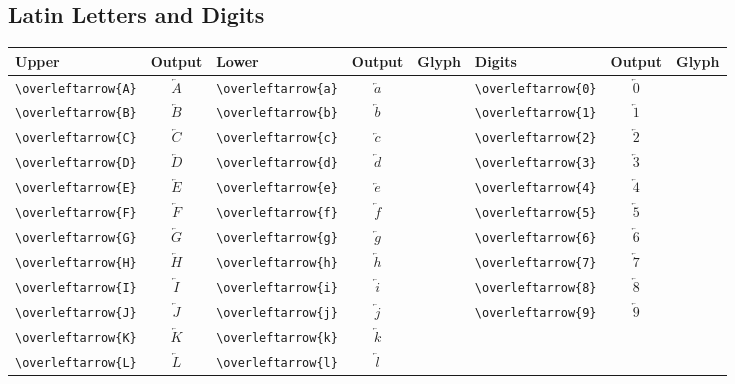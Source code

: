 \documentclass[12pt,a4paper]{article}
\begin{document}
\subsection*{Latin Letters and Digits}
\begin{longtable}{|l|c|l|c|c|l|c|c|}
\hline
\textbf{Upper} & \textbf{Output} & \textbf{Lower} & \textbf{Output} & \textbf{Glyph} & \textbf{Digits} & \textbf{Output} & \textbf{Glyph} \\
\hline
\verb|\overleftarrow{A}| & $\overleftarrow{A}$ & \verb|\overleftarrow{a}| & $\overleftarrow{a}$ & & \verb|\overleftarrow{0}| & $\overleftarrow{0}$ & \\
\verb|\overleftarrow{B}| & $\overleftarrow{B}$ & \verb|\overleftarrow{b}| & $\overleftarrow{b}$ & & \verb|\overleftarrow{1}| & $\overleftarrow{1}$ & \\
\verb|\overleftarrow{C}| & $\overleftarrow{C}$ & \verb|\overleftarrow{c}| & $\overleftarrow{c}$ & & \verb|\overleftarrow{2}| & $\overleftarrow{2}$ & \\
\verb|\overleftarrow{D}| & $\overleftarrow{D}$ & \verb|\overleftarrow{d}| & $\overleftarrow{d}$ & & \verb|\overleftarrow{3}| & $\overleftarrow{3}$ & \\
\verb|\overleftarrow{E}| & $\overleftarrow{E}$ & \verb|\overleftarrow{e}| & $\overleftarrow{e}$ & & \verb|\overleftarrow{4}| & $\overleftarrow{4}$ & \\
\verb|\overleftarrow{F}| & $\overleftarrow{F}$ & \verb|\overleftarrow{f}| & $\overleftarrow{f}$ & & \verb|\overleftarrow{5}| & $\overleftarrow{5}$ & \\
\verb|\overleftarrow{G}| & $\overleftarrow{G}$ & \verb|\overleftarrow{g}| & $\overleftarrow{g}$ & & \verb|\overleftarrow{6}| & $\overleftarrow{6}$ & \\
\verb|\overleftarrow{H}| & $\overleftarrow{H}$ & \verb|\overleftarrow{h}| & $\overleftarrow{h}$ & & \verb|\overleftarrow{7}| & $\overleftarrow{7}$ & \\
\verb|\overleftarrow{I}| & $\overleftarrow{I}$ & \verb|\overleftarrow{i}| & $\overleftarrow{i}$ & & \verb|\overleftarrow{8}| & $\overleftarrow{8}$ & \\
\verb|\overleftarrow{J}| & $\overleftarrow{J}$ & \verb|\overleftarrow{j}| & $\overleftarrow{j}$ & & \verb|\overleftarrow{9}| & $\overleftarrow{9}$ & \\
\verb|\overleftarrow{K}| & $\overleftarrow{K}$ & \verb|\overleftarrow{k}| & $\overleftarrow{k}$ & & & & \\
\verb|\overleftarrow{L}| & $\overleftarrow{L}$ & \verb|\overleftarrow{l}| & $\overleftarrow{l}$ & & & & \\

\end{longtable}
\end{document}
